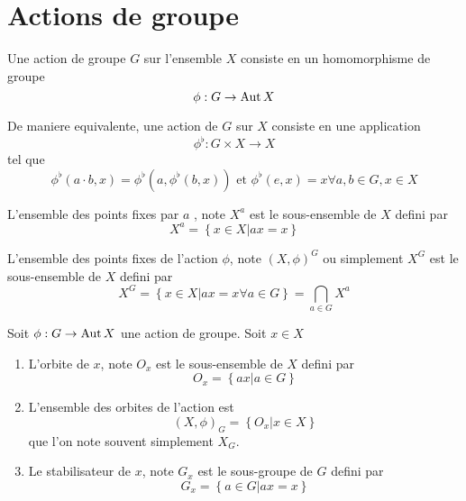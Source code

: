 \documentclass[../main.tex]{subfiles}
\begin{document}
\section{Actions de groupe}
\begin{defn}
	Une action de groupe $G$ sur l'ensemble $X$ consiste en un homomorphisme de groupe
	\[ 
	\phi: G \to \operatorname{Aut} X
	\]
	
\end{defn}
De maniere equivalente, une action de $G$ sur $X$ consiste en une application
\[ 
\phi^{\flat}: G \times X \to X
\]
tel que
\[ 
\phi^{\flat}( a\cdot b, x) = \phi^{\flat}( a, \phi^{\flat}( b,x) ) \text{ et } \phi^{\flat}( e,x) = x\forall a,b\in G, x \in X
\]
\begin{defn}
	L'ensemble des points fixes par $a$ , note $X^{a}$ est le sous-ensemble de $X$ defini par
	\[ 
	X^{a}= \left\{ x\in X| ax=x \right\} 
	\]
	
	L'ensemble des points fixes de l'action $\phi$, note $( X,\phi)^{G}$ ou simplement $X^{G}$ est le sous-ensemble de $X$ defini par
	\[ 
	X^{G}= \left\{ x\in X| ax= x \forall a \in G \right\} = \bigcap_{a\in G} X^{a}
	\]
	
\end{defn}	
\begin{defn}[Orbite]
	Soit $\phi: G\to \operatorname{Aut} X$ une action de groupe. Soit $x\in X$ 
	\begin{enumerate}
	\item L'orbite de $x$, note $O_x$ est le sous-ensemble de $X$ defini par
		\[ 
		O_x= \left\{ ax| a \in G \right\} 
		\]
		
	
	\item L'ensemble des orbites de l'action est 
		\[ 
			( X,\phi) _G= \left\{ O_x| x \in X \right\} 
		\]
		que l'on note souvent simplement $X_G$. 

	\item Le stabilisateur de $x$, note $G_x$ est le sous-groupe de $G$ defini par
		\[ 
		G_x= \left\{ a\in G| ax=x \right\} 
		\]
			
	\end{enumerate}
\end{defn}
\end{document}
